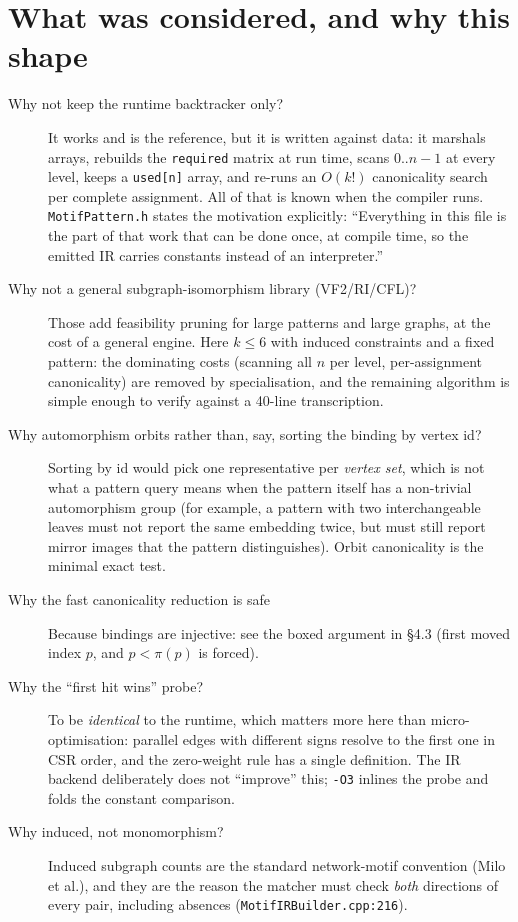 \documentclass[11pt,a4paper]{article}
\newcommand{\code}[1]{\texttt{#1}}
\newcommand{\file}[1]{\texttt{#1}}
\begin{document}
\section{What was considered, and why this shape}

\begin{description}
  \item[Why not keep the runtime backtracker only?] It works and is the reference,
  but it is written against data: it marshals arrays, rebuilds the
  \code{required} matrix at run time, scans $0..n-1$ at every level, keeps a
  \code{used[n]} array, and re-runs an $O(k!)$ canonicality search per complete
  assignment. All of that is known when the compiler runs. \file{MotifPattern.h}
  states the motivation explicitly: ``Everything in this file is the part of that
  work that can be done once, at compile time, so the emitted IR carries
  constants instead of an interpreter.''
  \item[Why not a general subgraph-isomorphism library (VF2/RI/CFL)?] Those add
  feasibility pruning for large patterns and large graphs, at the cost of a
  general engine. Here $k\le6$ with induced constraints and a fixed pattern:
  the dominating costs (scanning all $n$ per level, per-assignment canonicality)
  are removed by specialisation, and the remaining algorithm is simple enough to
  verify against a 40-line transcription.
  \item[Why automorphism orbits rather than, say, sorting the binding by vertex
  id?] Sorting by id would pick one representative per \emph{vertex set}, which
  is not what a pattern query means when the pattern itself has a non-trivial
  automorphism group (for example, a pattern with two interchangeable leaves must
  not report the same embedding twice, but must still report mirror images that
  the pattern distinguishes). Orbit canonicality is the minimal exact test.
  \item[Why the fast canonicality reduction is safe] Because bindings are
  injective: see the boxed argument in \S4.3 (first moved index $p$, and
  $p<\pi(p)$ is forced).
  \item[Why the ``first hit wins'' probe?] To be \emph{identical} to the runtime,
  which matters more here than micro-optimisation: parallel edges with different
  signs resolve to the first one in CSR order, and the zero-weight rule has a
  single definition. The IR backend deliberately does not ``improve'' this;
  \code{-O3} inlines the probe and folds the constant comparison.
  \item[Why induced, not monomorphism?] Induced subgraph counts are the standard
  network-motif convention (Milo et al.), and they are the reason the matcher
  must check \emph{both} directions of every pair, including absences
  (\file{MotifIRBuilder.cpp:216}).
\end{description}
\end{document}
